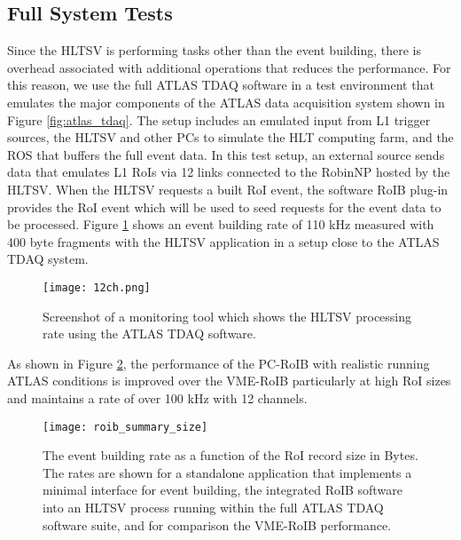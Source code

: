 \subsection{Full System Tests}\label{sec:perf_tdaq}

Since the HLTSV is performing tasks other than the event building, there is overhead associated with additional operations 
that reduces the performance. For this reason, we use the full ATLAS TDAQ software in a test environment that emulates the major components of the ATLAS data acquisition system shown in Figure \ref{fig:atlas_tdaq}. The setup includes an emulated input from L1 trigger sources, 
the HLTSV and other PCs to simulate the HLT computing farm, and the ROS that buffers the full event data. 
 In this test setup, an external source sends data that emulates L1 RoIs via 12 links connected to the 
RobinNP hosted by the HLTSV. When the HLTSV requests a built RoI event, the software RoIB plug-in provides the RoI event which will be used 
to seed requests for the event data to be processed.
 Figure \ref{fig:partition} shows an event building rate of 110 kHz measured with 400 byte fragments with the HLTSV application in a setup close to the ATLAS TDAQ system. 

\begin{figure}[tbp] %
\centering
\texttt{[image: 12ch.png]}
\caption{Screenshot of a monitoring tool which shows the HLTSV processing rate using the ATLAS TDAQ software.}
\label{fig:partition}
\end{figure}

As shown in Figure \ref{fig:roib_summary}, the performance of the PC-RoIB with realistic running ATLAS conditions is improved over the VME-RoIB particularly at high RoI sizes and maintains a rate of over 100 kHz with 12 channels. 

\begin{figure}[t!]
\centering
\texttt{[image: roib\_summary\_size]} 
\caption{The event building rate as a function of the RoI record size in Bytes. The rates are shown for a standalone application that implements 
  a minimal interface for event building, the integrated RoIB software into an HLTSV process running within the full ATLAS TDAQ software suite, and for comparison the VME-RoIB performance.}
\label{fig:roib_summary}
\end{figure} 

